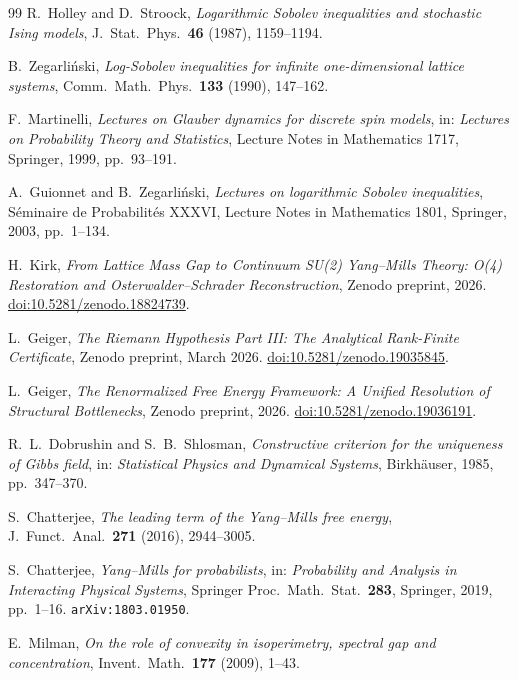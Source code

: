 \documentclass[12pt,a4paper]{article}
\theoremstyle{definition}
\theoremstyle{plain}
\theoremstyle{remark}
\begin{document}
\begin{thebibliography}{99}
R.~Holley and D.~Stroock, \emph{Logarithmic Sobolev inequalities and stochastic Ising models}, J.~Stat.\ Phys.\ \textbf{46} (1987), 1159--1194.

B.~Zegar\-li\'nski, \emph{Log-Sobolev inequalities for infinite one-dimensional lattice systems}, Comm.\ Math.\ Phys.\ \textbf{133} (1990), 147--162.

F.~Martinelli, \emph{Lectures on Glauber dynamics for discrete spin models}, in: \emph{Lectures on Probability Theory and Statistics}, Lecture Notes in Mathematics 1717, Springer, 1999, pp.~93--191.

A.~Guionnet and B.~Zegar\-li\'nski, \emph{Lectures on logarithmic Sobolev inequalities}, S\'eminaire de Probabilit\'es XXXVI, Lecture Notes in Mathematics 1801, Springer, 2003, pp.~1--134.

H.~Kirk, \emph{From Lattice Mass Gap to Continuum SU(2) Yang--Mills Theory: O(4) Restoration and Osterwalder--Schrader Reconstruction}, Zenodo preprint, 2026.
\href{https://doi.org/10.5281/zenodo.18824739}{doi:10.5281/zenodo.18824739}.

L.~Geiger, \emph{The Riemann Hypothesis Part III: The Analytical Rank-Finite Certificate}, Zenodo preprint, March 2026.
\href{https://doi.org/10.5281/zenodo.19035845}{doi:10.5281/zenodo.19035845}.

L.~Geiger, \emph{The Renormalized Free Energy Framework: A Unified Resolution of Structural Bottlenecks}, Zenodo preprint, 2026.
\href{https://doi.org/10.5281/zenodo.19036191}{doi:10.5281/zenodo.19036191}.

R.~L.~Dobrushin and S.~B.~Shlosman, \emph{Constructive criterion for the
uniqueness of Gibbs field}, in: \emph{Statistical Physics and Dynamical
Systems}, Birkh\"auser, 1985, pp.~347--370.

S.~Chatterjee, \emph{The leading term of the Yang--Mills free energy},
J.~Funct.\ Anal.\ \textbf{271} (2016), 2944--3005.

S.~Chatterjee, \emph{Yang--Mills for probabilists}, in: \emph{Probability and Analysis in Interacting Physical Systems}, Springer Proc.\ Math.\ Stat.\ \textbf{283}, Springer, 2019, pp.~1--16. \texttt{arXiv:1803.01950}.

E.~Milman, \emph{On the role of convexity in isoperimetry, spectral gap
and concentration}, Invent.\ Math.\ \textbf{177} (2009), 1--43.


\end{thebibliography}
\end{document}
